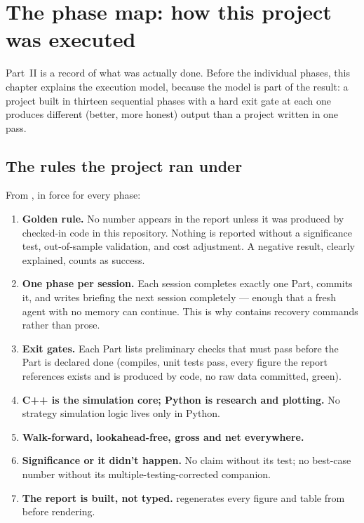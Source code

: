 \section{The phase map: how this project was executed}
\label{ch:phasemap}

Part~II is a record of what was actually done. Before the individual phases, this chapter
explains the execution model, because the model is part of the result: a project built in
thirteen sequential phases with a hard exit gate at each one produces different (better,
more honest) output than a project written in one pass.

\subsection{The rules the project ran under}
\label{sec:phasemap:rules}

From , in force for every phase:

\begin{enumerate}[label=\textbf{R\arabic*.}]
  \item \textbf{Golden rule.} No number appears in the report unless it was produced by
    checked-in code in this repository. Nothing is reported without a significance test,
    out-of-sample validation, and cost adjustment. A negative result, clearly explained,
    counts as success.
  \item \textbf{One phase per session.} Each session completes exactly one Part, commits
    it, and writes  briefing the next session completely --- enough that
    a fresh agent with no memory can continue. This is why  contains
    recovery commands rather than prose.
  \item \textbf{Exit gates.} Each Part lists preliminary checks that must pass before the
    Part is declared done (compiles, unit tests pass, every figure the report references
    exists and is produced by code, no raw data committed,  green).
  \item \textbf{C++ is the simulation core; Python is research and plotting.} No strategy
    simulation logic lives only in Python.
  \item \textbf{Walk-forward, lookahead-free, gross and net everywhere.}
  \item \textbf{Significance or it didn't happen.} No claim without its test; no best-case
    number without its multiple-testing-corrected companion.
  \item \textbf{The report is built, not typed.} 
    regenerates every figure and table from  before rendering.
\end{enumerate}

